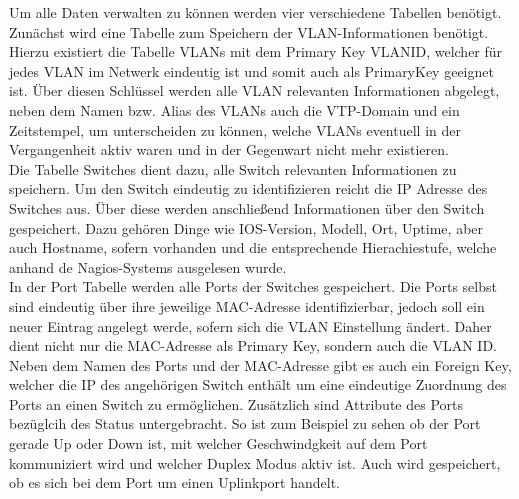 Um alle Daten verwalten zu können werden vier verschiedene Tabellen benötigt.
Zunächst wird eine Tabelle zum Speichern der VLAN-Informationen benötigt. Hierzu existiert die Tabelle VLANs mit dem Primary Key VLANID, welcher für jedes VLAN im Netwerk eindeutig ist und somit auch als PrimaryKey geeignet ist. Über diesen Schlüssel werden alle VLAN relevanten Informationen abgelegt, neben dem Namen bzw. Alias des VLANs auch die VTP-Domain und ein Zeitstempel, um unterscheiden zu können, welche VLANs eventuell in der Vergangenheit aktiv waren und in der Gegenwart nicht mehr existieren.\\
Die Tabelle Switches dient dazu, alle Switch relevanten Informationen zu speichern. 
Um den Switch eindeutig zu identifizieren reicht die IP Adresse des Switches aus. Über diese werden anschließend Informationen über den Switch gespeichert. Dazu gehören Dinge wie IOS-Version, Modell, Ort, Uptime, aber auch Hostname, sofern vorhanden und die entsprechende Hierachiestufe, welche anhand de Nagios-Systems ausgelesen wurde.\\
In der Port Tabelle werden alle Ports der Switches gespeichert. Die Ports selbst sind eindeutig über ihre jeweilige MAC-Adresse identifizierbar, jedoch soll ein neuer Eintrag angelegt werde, sofern sich die VLAN Einstellung ändert. Daher dient nicht nur die MAC-Adresse als Primary Key, sondern auch die VLAN ID. Neben dem Namen des Ports und der MAC-Adresse gibt es auch ein Foreign Key, welcher die IP des angehörigen Switch enthält um eine eindeutige Zuordnung des Ports an einen Switch zu ermöglichen. Zusätzlich sind Attribute des Ports bezüglcih des Status untergebracht. So ist zum Beispiel zu sehen ob der Port gerade Up oder Down ist, mit welcher Geschwindgkeit auf dem Port kommuniziert wird und welcher Duplex Modus aktiv ist. Auch wird gespeichert, ob es sich bei dem Port um einen Uplinkport handelt.\\
